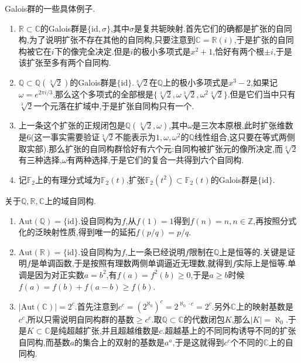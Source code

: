 Galois群的一些具体例子.
\begin{enumerate}
	\item $\mathbb{R}\subset\mathbb{C}$的Galois群是$\{\mathrm{id},\sigma\}$,其中$\sigma$是复共轭映射.首先它们的确都是扩张的自同构,为了说明扩张不存在其他的自同构,只要注意到$\mathbb{C}=\mathbb{R}(i)$,于是扩张的自同构被它在$i$下的像完全决定.但是$i$的极小多项式是$x^2+1$,恰好有两个根$\pm i$,于是该扩张至多有两个自同构.
	\item $\mathbb{Q}\subset\mathbb{Q}(\sqrt[3]{2})$的Galois群是$\{\mathrm{id}\}$.$\sqrt[3]{2}$在$\mathbb{Q}$上的极小多项式是$x^3-2$,如果记$\omega=e^{2\pi i/3}$,那么这个多项式的全部根是$\{\sqrt[3]{2},\omega\sqrt[3]{2},\omega^2\sqrt[3]{2}\}$.但是它们当中只有$\sqrt[3]{2}$一个元落在扩域中,于是扩张自同构只有一个.
	\item 上一条这个扩张的正规闭包是$\mathbb{Q}(\sqrt[3]{2},\omega)$,其中$\omega$是三次本原根,此时扩张维数是6(这一事实需要验证$\sqrt[3]{2}$不能表示为$1,\omega,\omega^2$的$\mathbb{Q}$线性组合,这只要在等式两侧取实部).那么扩张的自同构群恰好有六个元:自同构被扩张元的像所决定,而$\sqrt[3]{2}$有三种选择,$\omega$有两种选择,于是它们的复合一共得到六个自同构.
	\item 记$\mathbb{F}_2$上的有理分式域为$\mathbb{F}_2(t)$,扩张$\mathbb{F}_2(t^2)\subset\mathbb{F}_2(t)$的Galois群是$\{\mathrm{id}\}$.
\end{enumerate}

关于$\mathbb{Q},\mathbb{R},\mathbb{C}$上的域自同构.
\begin{enumerate}
	\item $\mathrm{Aut}(\mathbb{Q})=\{\mathrm{id}\}$.设自同构为$f$,从$f(1)=1$得到$f(n)=n,n\in\mathbb{Z}$,再按照分式化的泛映射性质,得到唯一的延拓$f(p/q)=p/q$.
	\item $\mathrm{Aut}(\mathbb{R})=\{\mathrm{id}\}$.设自同构为$f$,上一条已经说明$f$限制在$\mathbb{Q}$上是恒等的.关键是证明$f$是单调函数,于是按照有理数两侧单调逼近无理数,就得到$f$实际上是恒等.单调是因为对正实数$a=b^2$,有$f(a)=f^2(b)\ge0$,于是$a\ge b$时候$f(a)=f(b)+f(a-b)\ge f(b)$.
	\item $|\mathrm{Aut}(\mathbb{C})|=2^c$.首先注意到$c^c=(2^{\aleph_0})^c=2^{\aleph_0\cdot c}=2^c$.另外$\mathbb{C}$上的映射基数是$c^c$,所以只需说明自同构群的基数$\ge c^c$.取$\mathbb{Q}\subset\mathbb{C}$的代数闭包$K$,那么$|K|=\aleph_0$.于是$K\subset\mathbb{C}$是纯超越扩张,并且超越维数是$c$.超越基上的不同同构诱导不同的扩张自同构,而基数$a$的集合上的双射的基数是$a^a$,于是这就得到$c^c$个不同的$\mathbb{C}$上的自同构.
\end{enumerate}

